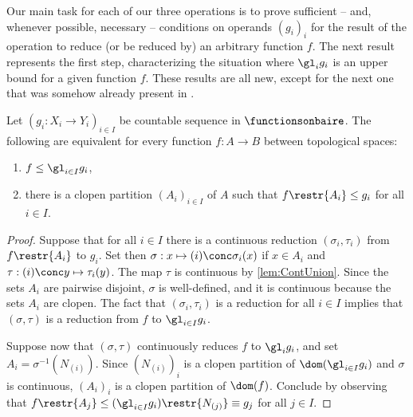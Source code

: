 Our main task for each of our three operations is to prove sufficient -- and, whenever possible, necessary -- conditions on operands $(g_i)_i$
for the result of the operation to reduce (or be reduced by) an arbitrary function $f$.
The next result represents the first step, characterizing the situation where $\gl_i g_i$ is an upper bound for a given function $f$.
These results are all new, except for the next one that was somehow already present in \cite[Lemma 3.3]{carroy2013quasi}.

\begin{proposition}\label{Gluingasupperbound}
Let $(g_i:X_i\to Y_i)_{i\in I}$ be countable sequence in $\functionsonbaire$. %
The following are equivalent for every function $f:A\to B$ between topological spaces:
\begin{enumerate} 
\item $f\leq \gl_{i\in I}g_i$, %
\item there is a clopen partition $(A_i)_{i\in I}$ of $A$ such that $f\restr{A_i}\leq g_i$ for all $i\in I$.
\end{enumerate}
\end{proposition}

\begin{proof}
Suppose that for all $i\in I$ there is a continuous reduction $(\sigma_i,\tau_i)$ from $f\restr{A_i}$ to $g_i$. Set then $\sigma:x\mapsto (i)\conc \sigma_i(x)$ if $x\in A_i$ and $\tau:(i)\conc y\mapsto\tau_i(y)$. The map $\tau$ is continuous by \cref{lem:ContUnion}. Since the sets $A_i$ are pairwise disjoint, $\sigma$ is well-defined, and it is continuous because the sets $A_i$ are clopen.
The fact that $(\sigma_i,\tau_i)$ is a reduction for all $i\in I$ implies that $(\sigma, \tau)$ is a reduction from $f$ to $\gl_{i\in I}g_i$.

Suppose now that $(\sigma,\tau)$ continuously reduces $f$ to $\gl_i g_i$, and set $A_i=\sigma^{-1}(N_{(i)})$.
Since $(N_{(i)})_i$ is a clopen partition of $\dom(\gl_{i\in I} g_i)$ and $\sigma$ is continuous, $(A_i)_i $ is a clopen partition of $\dom(f)$.
Conclude by observing that $f\restr{A_j}\leq(\gl_{i\in I}g_i)\restr{N_{(j)}}\equiv g_j$ for all $j\in I$.
\end{proof}


